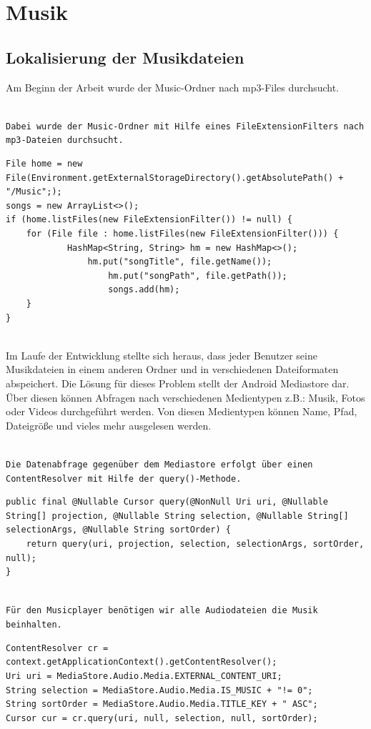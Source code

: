 \documentclass[FIPLY_base.tex]{subfiles}
\author{Andreas Denkmayr}
\date{19. Februar 2016}
\begin{document}
\section{Musik}
\subsection{Lokalisierung der Musikdateien}
Am Beginn der Arbeit wurde der Music-Ordner nach mp3-Files durchsucht. 

\ \\  
\texttt{Dabei wurde der Music-Ordner mit Hilfe eines FileExtensionFilters nach mp3-Dateien durchsucht.}  
\begin{lstlisting}
File home = new File(Environment.getExternalStorageDirectory().getAbsolutePath() + "/Music";);
songs = new ArrayList<>();
if (home.listFiles(new FileExtensionFilter()) != null) {
	for (File file : home.listFiles(new FileExtensionFilter())) {
     		HashMap<String, String> hm = new HashMap<>();
               	hm.put("songTitle", file.getName());
                	hm.put("songPath", file.getPath());
                	songs.add(hm);
	}
}    
\end{lstlisting}

\ \\
Im Laufe der Entwicklung stellte sich heraus, dass jeder Benutzer seine Musikdateien in einem anderen Ordner und in verschiedenen Dateiformaten abspeichert. 
Die Lösung für dieses Problem stellt der Android Mediastore dar. 
Über diesen können Abfragen nach verschiedenen Medientypen z.B.: Musik, Fotos oder Videos durchgeführt werden. Von diesen Medientypen können Name, Pfad, Dateigröße und vieles mehr ausgelesen werden.
  
\ \\  
\texttt{Die Datenabfrage gegenüber dem Mediastore erfolgt über einen ContentResolver mit Hilfe der query()-Methode.}  
\begin{lstlisting}
public final @Nullable Cursor query(@NonNull Uri uri, @Nullable String[] projection, @Nullable String selection, @Nullable String[] selectionArgs, @Nullable String sortOrder) {
	return query(uri, projection, selection, selectionArgs, sortOrder, null);
}
\end{lstlisting}

\ \\
\texttt{Für den Musicplayer benötigen wir alle Audiodateien die Musik beinhalten.}
\begin{lstlisting}
ContentResolver cr = context.getApplicationContext().getContentResolver();
Uri uri = MediaStore.Audio.Media.EXTERNAL_CONTENT_URI;
String selection = MediaStore.Audio.Media.IS_MUSIC + "!= 0";
String sortOrder = MediaStore.Audio.Media.TITLE_KEY + " ASC";
Cursor cur = cr.query(uri, null, selection, null, sortOrder);
\end{lstlisting}
\end{document}
